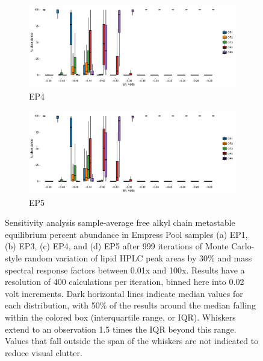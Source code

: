 \begin{figure}[h]\ContinuedFloat
\centering

    \begin{subfigure}[b]{\linewidth}
      	\includegraphics[width=1\linewidth]{"figs_app2/boxplot_ggplot_02bin Empress OF4 iter 999"}
      	\caption{EP4}
        \label{fig:EP4_mc}
    \end{subfigure}
    \begin{subfigure}[b]{\linewidth}
    	\includegraphics[width=1\linewidth]{"figs_app2/boxplot_ggplot_02bin Empress OF5 iter 999"}
    	\caption{EP5}
        \label{fig:EP5_mc}
    \end{subfigure}
    
    \caption{Sensitivity analysis sample-average free alkyl chain metastable equilibrium percent abundance in Empress Pool samples (a) EP1, (b) EP3, (c) EP4, and (d) EP5 after 999 iterations of Monte Carlo-style random variation of lipid HPLC peak areas by 30\% and mass spectral response factors between 0.01x and 100x. Results have a resolution of 400 calculations per iteration, binned here into 0.02 volt increments. Dark horizontal lines indicate median values for each distribution, with 50\% of the results around the median falling within the colored box (interquartile range, or IQR). Whiskers extend to an observation 1.5 times the IQR beyond this range. Values that fall outside the span of the whiskers are not indicated to reduce visual clutter.}
    \label{fig:EP_mc}
\end{figure}

